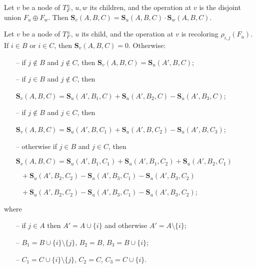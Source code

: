 \iffalse
\begin{lemma}
	Let $v$ be a node of $T^{\pm}_F$, $u,w$ its children, and the operation at $v$ is the disjoint union $F_u \oplus F_w$.
	Then $\mathbf{S}_v(A,B,C) = \mathbf{S}_u(A,B,C) \cdot \mathbf{S}_w(A,B,C)$.
\end{lemma}

\begin{lemma}
	Let $v$ be a node of $T^{\pm}_F$, $u$ its child, and the operation at $v$ is recoloring $\rho_{i,j}(F_u)$.
	If $i \in B$ or $i \in C$, then $\mathbf{S}_v(A,B,C) = 0$.
	Otherwise:
	\begin{itemize}
		\item[--] if $j \not\in B$ and $j \not\in C$, then $\mathbf{S}_v(A,B,C) = \mathbf{S}_u(A',B,C)$;
		\item[--] if $j \in B$ and $j \not\in C$, then \vspace{-4pt}
		
		$\mathbf{S}_v(A,B,C) = \mathbf{S}_u(A',B_1,C) + \mathbf{S}_u(A',B_2,C) - \mathbf{S}_u(A',B_3,C)$;
		
		\item[--] if $j \not\in B$ and $j \in C$, then \vspace{-4pt}
		
		$\mathbf{S}_v(A,B,C) = \mathbf{S}_u(A',B,C_1) + \mathbf{S}_u(A',B,C_2) - \mathbf{S}_u(A',B,C_3)$;
		
		\item[--] otherwise if $j \in B$ and $j \in C$, then \vspace{-4pt}
		
		$\mathbf{S}_v(A,B,C) = \mathbf{S}_u(A',B_1,C_1) + \mathbf{S}_u(A',B_1,C_2) + \mathbf{S}_u(A',B_2,C_1)$ \vspace{-4pt}
		
		$\phantom{w} + \mathbf{S}_u(A',B_2,C_2) - \mathbf{S}_u(A',B_3,C_1) - \mathbf{S}_u(A',B_3,C_2)$ \vspace{-4pt}
		
		$\phantom{w} + \mathbf{S}_u(A',B_2,C_2) - \mathbf{S}_u(A',B_3,C_1) - \mathbf{S}_u(A',B_3,C_2)$;
	\end{itemize}
	where
	\begin{itemize}
		\item[--] if $j \in A$ then $A' = A \cup \{i\}$ and otherwise $A' = A \setminus \{i\}$;
		\item[--] $B_1 = B \cup \{i\} \setminus \{j\}$, $B_2 = B$, $B_3 = B \cup \{i\}$;
		\item[--] $C_1 = C \cup \{i\} \setminus \{j\}$, $C_2 = C$, $C_3 = C \cup \{i\}$.
	\end{itemize}
\end{lemma}

